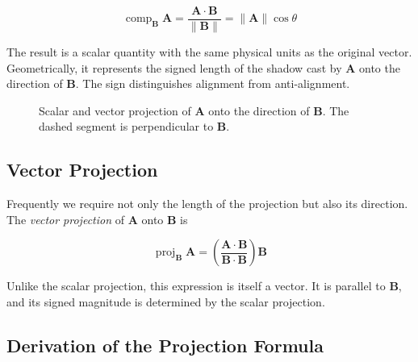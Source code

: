 \[
\boxed{
\operatorname{comp}_{\mathbf B}\mathbf A
=
\frac{\mathbf A\cdot\mathbf B}{\lVert\mathbf B\rVert}
=
\lVert\mathbf A\rVert\cos\theta
}
\]

The result is a scalar quantity with the same physical units as the original
vector. Geometrically, it represents the signed length of the shadow cast by
$\mathbf A$ onto the direction of $\mathbf B$. The sign distinguishes alignment
from anti-alignment.

\begin{figure}[htbp]
\centering
\begingroup

\endgroup
\caption{Scalar and vector projection of $\mathbf A$ onto the direction of
$\mathbf B$. The dashed segment is perpendicular to $\mathbf B$.}
\label{fig:vector-projection}
\end{figure}

\subsection{Vector Projection}

Frequently we require not only the length of the projection but also its
direction. The \emph{vector projection} of $\mathbf A$ onto $\mathbf B$ is

\[
\boxed{
\operatorname{proj}_{\mathbf B}\mathbf A
=
\left(
\frac{\mathbf A\cdot\mathbf B}{\mathbf B\cdot\mathbf B}
\right)\mathbf B
}
\]

Unlike the scalar projection, this expression is itself a vector. It is parallel
to $\mathbf B$, and its signed magnitude is determined by the scalar projection.

\subsection{Derivation of the Projection Formula}

